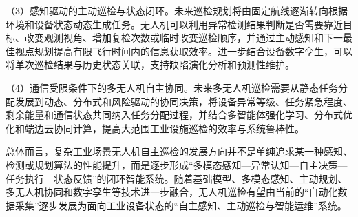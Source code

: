 （3）感知驱动的主动巡检与状态闭环。未来巡检规划将由固定航线逐渐转向根据环境和设备状态动态生成任务。无人机可以利用异常检测结果判断是否需要靠近目标、改变观测视角、增加复检次数或临时改变巡检顺序，并通过主动感知和下一最佳视点规划提高有限飞行时间内的信息获取效率\cite{bircher2016receding,placed2023active}。进一步结合设备数字孪生，可以将单次巡检结果与历史状态关联，支持缺陷演化分析和预测性维护\cite{tao2019digital}。

（4）通信受限条件下的多无人机自主协同。未来多无人机巡检需要从静态任务分配发展到动态、分布式和风险驱动的协同决策，将设备异常等级、任务紧急程度、剩余能量和通信状态共同纳入任务分配过程，并结合多智能体强化学习、分布式优化和端边云协同计算，提高大范围工业设施巡检的效率与系统鲁棒性\cite{yu2022surprising,zhou2023racer,zhang2019energy,zhou2018computation}。

总体而言，复杂工业场景无人机自主巡检的发展方向并不是单纯追求某一种感知、检测或规划算法的性能提升，而是逐步形成“多模态感知—异常认知—自主决策—任务执行—状态反馈”的闭环智能系统。随着基础模型、多模态感知、主动规划、多无人机协同和数字孪生等技术进一步融合，无人机巡检有望由当前的“自动化数据采集”逐步发展为面向工业设备状态的“自主感知、主动巡检与智能运维”系统。
